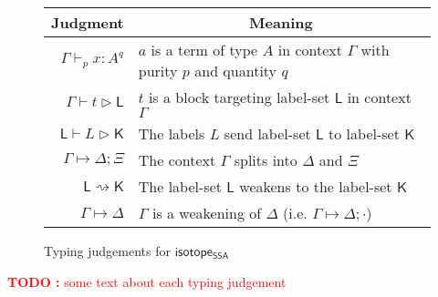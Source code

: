 \documentclass[acmsmall,screen,review]{acmart}
\newcounter{todos}
\newcommand{\TODO}[1]{{
  \stepcounter{todos}
  \begin{center}\large{\textcolor{red}{\textbf{TODO \arabic{todos}:} #1}}\end{center}
}}
\newcommand{\ms}[1]{\ensuremath{\mathsf{#1}}}
\newcommand{\csplits}[3]{#1 \mapsto #2;#3}
\newcommand{\cwk}[2]{#1 \mapsto #2}
\newcommand{\lwk}[2]{#1 \rightsquigarrow #2}
\newcommand{\tlin}[2]{#2 \subseteq \ms{lin}(#1)}
\newcommand{\ltlin}[3]{#3 \subseteq \ms{lin}(#1) \cap #2}
\newcommand{\hasty}[5]{#1 \vdash_{#2} #3: {#4}^{#5}}
\newcommand{\haslb}[3]{#1 \vdash #2 \rhd #3}
\newcommand{\lhaslb}[3]{#1 \vdash #2 \rhd #3}
\newcommand{\isotopessa}{\ms{isotope_{SSA}}}
\begin{document}
\begin{figure}
  \begin{center}        
    \begingroup
    \renewcommand{\arraystretch}{1.5}
    \setlength{\tabcolsep}{2em}
    \begin{tabular}{rl}
        \multicolumn{1}{c}{Judgment} & \multicolumn{1}{c}{Meaning} \\ \hline
        \(\hasty{\Gamma}{p}{x}{A}{q}\) &
        \(a\) is a term of type \(A\) in context \(\Gamma\) with purity \(p\) and quantity \(q\) \\
        \(\haslb{\Gamma}{t}{\ms{L}}\) &
        \(t\) is a block targeting label-set \(\ms{L}\) in context \(\Gamma\) \\
        \(\lhaslb{\ms{L}}{L}{\ms{K}}\) &
        The labels \(L\) send label-set \(\ms{L}\) to label-set \(\ms{K}\) \\
        \(\csplits{\Gamma}{\Delta}{\Xi}\) &
        The context \(\Gamma\) splits into \(\Delta\) and \(\Xi\) \\
        \(\lwk{\ms{L}}{\ms{K}}\) &
        The label-set \(\ms{L}\) weakens to the label-set \(\ms{K}\) \\
        \(\cwk{\Gamma}{\Delta}\) &
        \(\Gamma\) is a weakening of \(\Delta\) 
        (i.e. \(\csplits{\Gamma}{\Delta}{\cdot}\))
    \end{tabular}
    \endgroup
  \end{center}
  \caption{Typing judgements for \isotopessa}
  \label{fig:ssa-judgements}
\end{figure}

\TODO{some text about each typing judgement}
\end{document}
